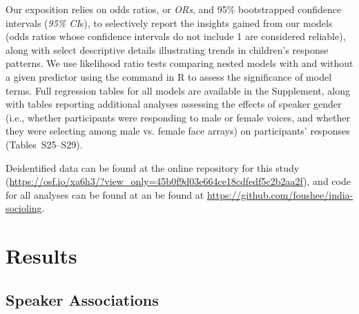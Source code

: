 \documentclass{foushee-adapted-preprint}
\newcommand{\geogendertab}{S25}
\newcommand{\facelabelgendertab}{S29}
\begin{document}
Our exposition relies on odds ratios, or \textit{ORs}, and 95\% bootstrapped confidence intervals (\textit{95\% CI}s), to selectively report the insights gained from our models (odds ratios whose confidence intervals do not include 1 are considered reliable), along with select descriptive details illustrating trends in children's response patterns. 
We use likelihood ratio tests comparing nested models with and without a given predictor using the  command in R \parencite{R} to assess the significance of model terms. 
Full regression tables for all models are available in the Supplement, along with tables reporting additional analyses assessing the effects of speaker gender 
(i.e., whether participants were responding to male or female voices, and whether they were selecting among male vs. female face arrays) on participants' responses (Tables~\geogendertab--\facelabelgendertab).

Deidentified data can be found at the online repository for this study (\url{https://osf.io/xa6h3/?view_only=45b0f9d03e664ce18cdfedf5c2b2aa2f}), and code for all analyses can be found at an be found at \url{https://github.com/foushee/india-socioling}.

\section{Results}
\subsection{Speaker Associations}
\end{document}
